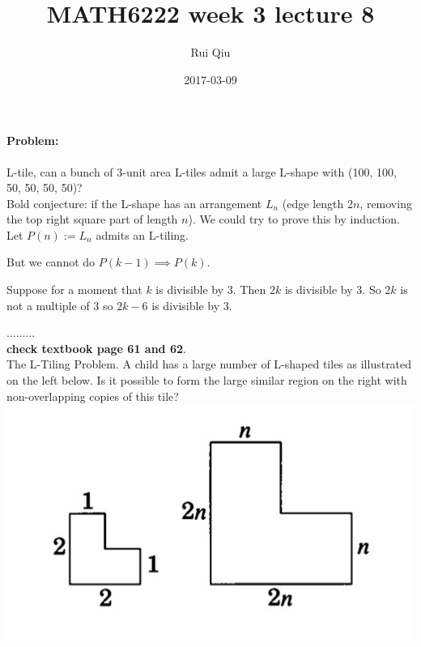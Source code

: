\documentclass[a4paper, 11pt, twoside]{article}
\begin{document}
\title{MATH6222 week 3 lecture 8}
\author{Rui Qiu}
\date{2017-03-09}

\maketitle

\paragraph{Problem:} L-tile, can a bunch of 3-unit area L-tiles admit a large L-shape with (100, 100, 50, 50, 50, 50)?\\

Bold conjecture: if the L-shape has an arrangement $L_n$ (edge length $2n$, removing the top right square part of length $n$). We could try to prove this by induction.\\

Let $P(n):= L_n$ admits an L-tiling.

But we cannot do $P(k-1)\implies P(k)$.

Suppose for a moment that $k$ is divisible by $3$. Then $2k$ is divisible by $3$. So $2k$ is not a multiple of $3$ so $2k-6$ is divisible by $3$.

.........\\

\textbf{check textbook page 61 and 62}.\\

The L-Tiling Problem. A child has a large number of L-shaped tiles as illustrated on the left below. Is it possible to form the large similar region on the right with non-overlapping copies of this tile?\\

\includegraphics[width=\linewidth]{images/L1}
\end{document}
